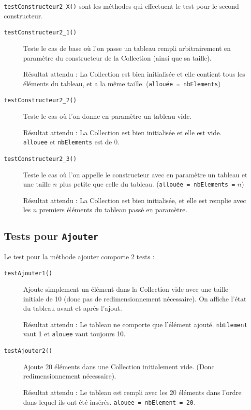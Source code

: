 \documentclass[11pt]{article}
\begin{document}
\texttt{testConstructeur2\_X()} sont les méthodes qui effectuent le test pour le second constructeur. 
\begin{description}
	\item[\texttt{testConstructeur2\_1()}] Teste le cas de base où l'on passe un tableau rempli arbitrairement en paramètre du constructeur de la Collection (ainsi que sa taille).
	
	Résultat attendu : La Collection est bien initialisée et elle contient tous les éléments du tableau, et a la même taille. ({\tt allouée = nbElements})
	
	\item[\texttt{testConstructeur2\_2()}] Teste le cas où l'on donne en paramètre un tableau vide.
	
	Résultat attendu : La Collection est bien initialisée et elle est vide. \texttt{allouee} et \texttt{nbElements} est de 0. 
	
	\item[\texttt{testConstructeur2\_3()}] Teste le cas où l'on appelle le constructeur avec en paramètre un tableau et une taille $n$ plus petite que celle du tableau. ({\tt allouée = nbElements =} $n$)
	
	Résultat attendu : La Collection est bien initialisée, et elle est remplie avec les $n$ premiers éléments du tableau passé en paramètre.
\end{description}

\subsection{Tests pour \tt Ajouter}
Le test pour la méthode ajouter comporte 2 tests :

\begin{description}

	\item[\texttt{testAjouter1()}] Ajoute simplement un élément dans la Collection vide avec une taille initiale de 10 (donc pas de redimensionnement nécessaire). On affiche l'état du tableau avant et après l'ajout.
	
	Résultat attendu : Le tableau ne comporte que l'élément ajouté. \texttt{nbElement} vaut 1 et \texttt{alouee} vaut toujours 10. 
	
	\item[\texttt{testAjouter2()}] Ajoute 20 éléments dans une Collection initialement vide. (Donc redimensionnement nécessaire).
	
	Résultat attendu : Le tableau est rempli avec les 20 éléments dans l'ordre dans lequel ils ont été insérés. \texttt{alouee = nbElement = 20}.
	
\end{description}
\end{document}
